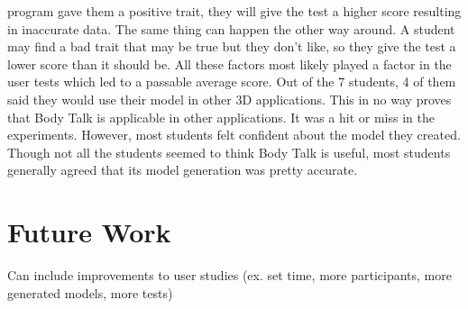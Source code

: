 \documentclass[journal]{vgtc}                %
\begin{document}
program gave them 
a positive trait, they will give the test a higher score resulting in inaccurate data. The same thing can happen the other way around. A 
student may find 
a bad trait that may be true but they don't like, so they give the test a lower score than it should be. All these factors most likely 
played a factor in 
the user tests which led to a passable average score. Out of the 7 students, 4 of them said they would use their model in other 3D 
applications. This in no way proves that Body Talk is applicable in other applications. It was a hit or miss in the experiments. 
However, most students felt confident about the model they created. Though not all the students seemed to think Body Talk is useful, 
most students generally agreed that its model generation was pretty accurate. \newline

\noindent       

\section{Future Work}

Can include improvements to user studies (ex. set time, more participants, more generated models, more tests) 
\end{document}
